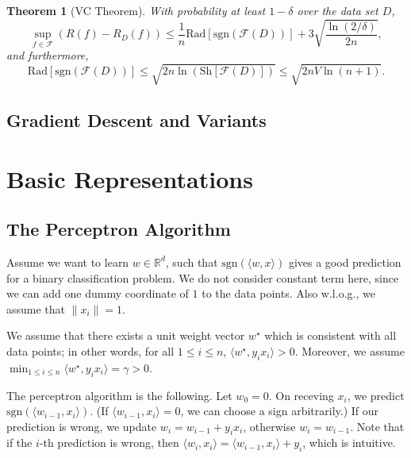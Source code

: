 \documentclass[openany]{book}
\newtheorem{theorem}{Theorem}[chapter]
\theoremstyle{definition}
\theoremstyle{remark}
\begin{document}
\begin{theorem}[VC Theorem]
    With probability at least $1-\delta$ over the data set $D$,
    \begin{equation*}
        \sup_{f\in \mathcal{F}}\left(R(f)-R_{D}(f)\right)\le \frac{1}{n}\mathrm{Rad}[\mathrm{sgn}(\mathcal{F}(D))]+3\sqrt{\frac{\ln(2/\delta)}{2n}},
    \end{equation*}
    and furthermore,
    \begin{equation*}
        \mathrm{Rad}[\mathrm{sgn}(\mathcal{F}(D))]\le\sqrt{2n\ln\left(\mathrm{Sh}[\mathcal{F}(D)]\right)}\le\sqrt{2nV\ln(n+1)}.
    \end{equation*}
\end{theorem}

\chapter{Gradient Descent and Variants}


\part{Basic Representations}
\chapter{The Perceptron Algorithm}
Assume we want to learn $w\in \mathbb{R}^d$, such that $\mathrm{sgn}(\langle w,x\rangle)$ gives a good prediction for a binary classification problem. We do not consider constant term here, since we can add one dummy coordinate of $1$ to the data points. Also w.l.o.g., we assume that $\|x_i\|=1$.

We assume that there exists a unit weight vector $w^{\star}$ which is consistent with all data points; in other words, for all $1\le i\le n$, $\langle w^{\star},y_ix_i\rangle>0$. Moreover, we assume $\min_{1\le i\le n}\langle w^{\star},y_ix_i\rangle=\gamma>0$.

The perceptron algorithm is the following. Let $w_0=0$. On receving $x_i$, we predict $\mathrm{sgn}(\langle w_{i-1},x_i\rangle)$. (If $\langle w_{i-1},x_i\rangle=0$, we can choose a sign arbitrarily.) If our prediction is wrong, we update $w_i=w_{i-1}+y_ix_i$, otherwise $w_i=w_{i-1}$. Note that if the $i$-th prediction is wrong, then $\langle w_i,x_i\rangle=\langle w_{i-1},x_i\rangle+y_i$, which is intuitive.
\end{document}
